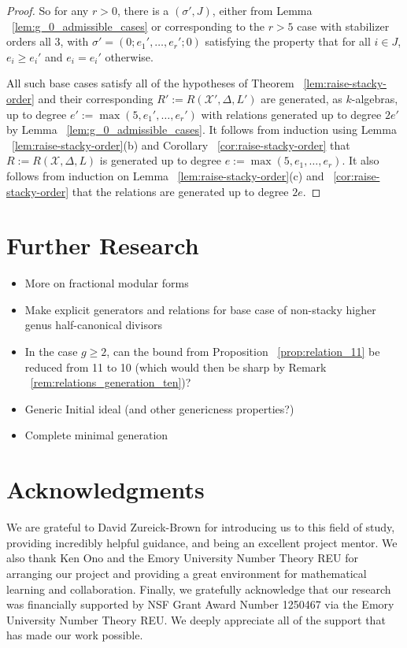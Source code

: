 \documentclass{amsart}
\theoremstyle{plain}
\theoremstyle{definition}
\theoremstyle{remark}
\numberwithin{equation}{section}
\newcommand \sx{\mathscr X}
\newcommand \halfcan{L}
\begin{document}
\begin{proof}
So for any $r > 0$, there is a $(\sigma', J)$, either from
Lemma ~\ref{lem:g_0_admissible_cases} or corresponding to
the $r > 5$ case with stabilizer orders all $3$, with $\sigma' =
(0; e_1', \ldots, e_r'; 0)$ satisfying the property that for all $i
\in J$, $e_i \geq e_i'$ and $e_i = e_i'$ otherwise.

All such base cases satisfy all of the hypotheses of Theorem
~\ref{lem:raise-stacky-order} and their corresponding $R' := R(\sx',
\Delta, \halfcan')$ are generated, as $k$-algebras, up to degree
$e' := \max(5, e_1', \ldots, e_r')$ with relations generated up to
degree $2e'$ by Lemma ~\ref{lem:g_0_admissible_cases}. It follows
from induction using Lemma ~\ref{lem:raise-stacky-order}(b) and
Corollary ~\ref{cor:raise-stacky-order} that $R := R(\sx, \Delta,
\halfcan)$ is generated up to degree $e := \max(5, e_1, \ldots, e_r)$.
It also follows from induction on Lemma ~\ref{lem:raise-stacky-order}(c)
and ~\ref{cor:raise-stacky-order} that the relations are generated
up to degree $2e$. 
 \end{proof}

\section{Further Research}
\label{sec:further-questions}
\begin{itemize}
	\item More on fractional modular forms
	\item Make explicit generators and relations for base case of non-stacky higher genus half-canonical divisors
	\item In the case $g \geq 2$, can the bound from Proposition ~\ref{prop:relation_11} be reduced from 11 to 10 (which would then be sharp by Remark ~\ref{rem:relations_generation_ten})?  
	\item Generic Initial ideal (and other genericness properties?)
	\item Complete minimal generation
\end{itemize}


\section{Acknowledgments}
We are grateful to David Zureick-Brown for introducing us to this
field of study, providing incredibly helpful guidance, and being an
excellent project mentor. We also thank Ken Ono and the Emory University
Number Theory REU for arranging our project and providing a great
environment for mathematical learning and collaboration. Finally, we
gratefully acknowledge that our research was financially supported by
NSF Grant Award Number 1250467 via the Emory University Number Theory REU.
We deeply appreciate all of the support that has made our work possible.


\nocite{*}
{}

\end{document}
